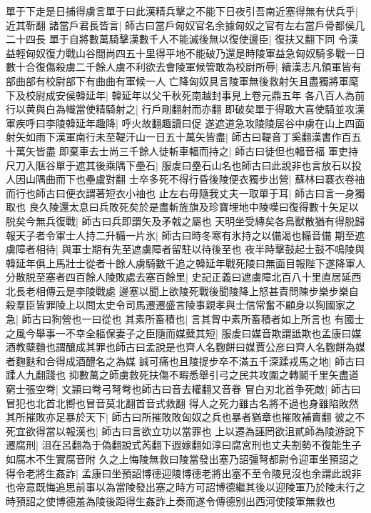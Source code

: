 單于下走是日捕得虜言單于曰此漢精兵擊之不能下日夜引吾南近塞得無有伏兵乎|{
	近其靳翻}
諸當戶君長皆言|{
	師古曰當戶匈奴官名余據匈奴之官有左右當戶骨都侯几二十四長}
單于自將數萬騎擊漢數千人不能滅後無以復使邊臣|{
	復扶又翻下同}
令漢益輕匈奴復力戰山谷間尚四五十里得平地不能破乃還是時陵軍益急匈奴騎多戰一日數十合復傷殺虜二千餘人虜不利欲去會陵軍候管敢為校尉所辱|{
	續漢志凡領軍皆有部曲部有校尉部下有曲曲有軍候一人}
亡降匈奴具言陵軍無後救射矢且盡獨將軍麾下及校尉成安侯韓延年|{
	韓延年以父千秋死南越封事見上卷元鼎五年}
各八百人為前行以黄與白為幟當使精騎射之|{
	行戶剛翻射而亦翻}
即破矣單于得敢大喜使騎並攻漢軍疾呼曰李陵韓延年趣降|{
	呼火故翻趣讀曰促}
遂遮道急攻陵陵居谷中虜在山上四面射矢如雨下漢軍南行未至鞮汗山一日五十萬矢皆盡|{
	師古曰鞮音丁奚翻漢書作百五十萬矢皆盡}
即棄車去士尚三千餘人徒斬車輻而持之|{
	師古曰徒但也輻音福}
軍吏持尺刀入陿谷單于遮其後乘隅下壘石|{
	服䖍曰壘石山名也師古曰此說非也言放石以投人因山隅曲而下也壘盧對翻}
士卒多死不得行昏後陵便衣獨步出營|{
	蘇林曰褰衣卷䄂而行也師古曰便衣謂著短衣小䄂也}
止左右毋隨我丈夫一取單于耳|{
	師古曰言一身獨取也}
良久陵還太息曰兵敗死矣於是盡斬旌旗及珍寶埋地中陵嘆曰復得數十矢足以脱矣今無兵復戰|{
	師古曰兵即謂矢及矛戟之屬也}
天明坐受縳矣各鳥獸散猶有得脱歸報天子者令軍士人持二升糒一片氷|{
	師古曰時冬寒有氷持之以備渴也糒音備}
期至遮虜障者相待|{
	與軍士期有先至遮虜障者留駐以待後至也}
夜半時擊鼓起士鼓不鳴陵與韓延年俱上馬壯士從者十餘人虜騎數千追之韓延年戰死陵曰無面目報陛下遂降軍人分散脱至塞者四百餘人陵敗處去塞百餘里|{
	史記正義曰遮虜障北百八十里直居延西北長老相傳云是李陵戰處}
邊塞以聞上欲陵死戰後聞陵降上怒甚責問陳步樂步樂自殺羣臣皆罪陵上以問太史令司馬遷遷盛言陵事親孝與士信常奮不顧身以狥國家之急|{
	師古曰狥營也一曰從也}
其素所畜積也|{
	言其胷中素所畜積者如上所言也}
有國士之風今舉事一不幸全軀保妻子之臣隨而媒糵其短|{
	服䖍曰媒音欺謂詆欺也孟康曰媒酒教糵麯也謂釀成其罪也師古曰孟說是也齊人名麴餅曰媒賈公彦曰齊人名麴餅為媒者麴麩和合得成酒醴名之為媒}
誠可痛也且陵提步卒不滿五千深蹂戎馬之地|{
	師古曰蹂人九翻踐也}
抑數萬之師虜救死扶傷不暇悉舉引弓之民共攻圍之轉鬬千里矢盡道窮士張空弮|{
	文頴曰弮弓弩弮也師古曰音去權翻又音眷}
冒白刃北首争死敵|{
	師古曰冒犯也北首北嚮也冒音莫北翻首音式救翻}
得人之死力雖古名將不過也身雖陷敗然其所摧敗亦足暴於天下|{
	師古曰所摧敗敗匈奴之兵也暴者猶章也摧敗補賣翻}
彼之不死宜欲得當以報漢也|{
	師古曰言欲立功以當罪也}
上以遷為誣罔欲沮貳師為陵游說下遷腐刑|{
	沮在呂翻為于偽翻說式芮翻下遐嫁翻如淳曰腐宮刑也丈夫割勢不復能生子如腐木不生實腐音附}
久之上悔陵無救曰陵當發出塞乃詔彊弩都尉令迎軍坐預詔之得令老將生姦詐|{
	孟康曰坐預詔博德迎陵博德老將出塞不至令陵見沒也余謂此說非也帝意既悔追思前事以為當陵發出塞之時方可詔博德繼其後以迎陵軍乃於陵未行之時預詔之使博德羞為陵後距得生姦詐上奏而遂令傳德别出西河使陵軍無救也}
